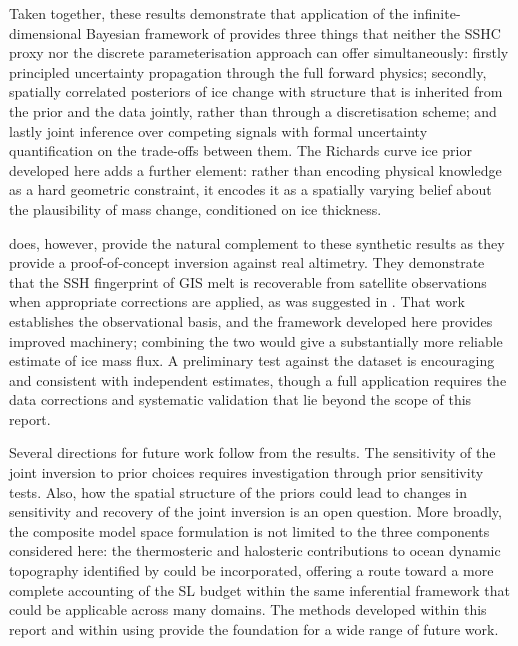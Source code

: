 Taken together, these results demonstrate that application of the infinite-dimensional Bayesian framework of \textcite{heathcoteScaleableBayesianFramework2026} provides three things that neither the SSHC proxy nor the discrete parameterisation approach can offer simultaneously: firstly principled uncertainty propagation through the full forward physics; secondly, spatially correlated posteriors of ice change with structure that is inherited from the prior and the data jointly, rather than through a discretisation scheme; and lastly joint inference over competing signals with formal uncertainty quantification on the trade-offs between them. The Richards curve ice prior developed here adds a further element: rather than encoding physical knowledge as a hard geometric constraint, it encodes it as a spatially varying belief about the plausibility of mass change, conditioned on ice thickness.

\textcite{coulsonInvertingSeaSurface2026} does, however, provide the natural complement to these synthetic results as they provide a proof-of-concept inversion against real altimetry. They demonstrate that the SSH fingerprint of GIS melt is recoverable from satellite observations when appropriate corrections are applied, as was suggested in \textcite{coulsonDetectionSeaLevel2022}. That work establishes the observational basis, and the framework developed here provides improved machinery; combining the two would give a substantially more reliable estimate of ice mass flux. A preliminary test against the \textcite{copernicusclimatechangeserviceGLOBALOCEANGRIDDED2021} dataset is encouraging and consistent with independent estimates, though a full application requires the data corrections and systematic validation that lie beyond the scope of this report.

Several directions for future work follow from the results. The sensitivity of the joint inversion to prior choices requires investigation through prior sensitivity tests. Also, how the spatial structure of the priors could lead to changes in sensitivity and recovery of the joint inversion is an open question. More broadly, the composite model space formulation is not limited to the three components considered here: the thermosteric and halosteric contributions to ocean dynamic topography identified by \textcite{heathcoteScaleableBayesianFramework2026} could be incorporated, offering a route toward a more complete accounting of the SL budget within the same inferential framework that could be applicable across many domains. The methods developed within this report and within \textcite{heathcoteScaleableBayesianFramework2026} using  provide the foundation for a wide range of future work.
